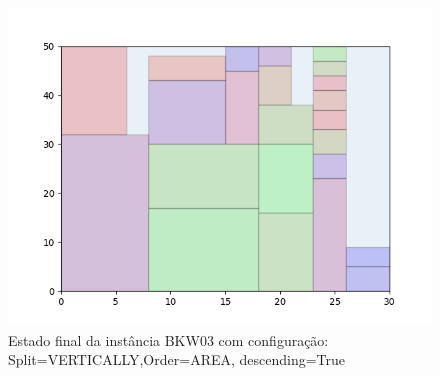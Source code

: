 \begin{figure}[H]
    \centering
    \caption[]{Estado final da instância BKW03 com configuração: Split=VERTICALLY,Order=AREA, descending=True}
    \label{fig:bkw03-vertically-area-true}
    \includegraphics[scale=0.5]{output/figures/bkw/bkw03/vertically/area/true/00}
\end{figure}